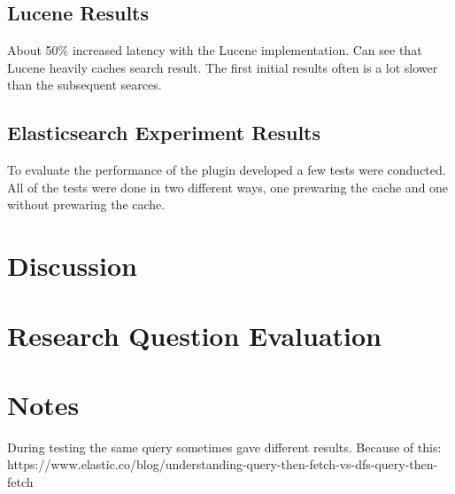 \subsection{Lucene Results}
About 50\% increased latency with the Lucene implementation.
Can see that Lucene heavily caches search result.
The first initial results often is a lot slower than the subsequent searces.

\subsection{Elasticsearch Experiment Results}
To evaluate the performance of the plugin developed a few tests were conducted.
All of the tests were done in two different ways,
one prewaring the cache and one without prewaring the cache.

\section{Discussion}

\section{Research Question Evaluation}

\section{Notes}
During testing the same query sometimes gave different results.
Because of this: https://www.elastic.co/blog/understanding-query-then-fetch-vs-dfs-query-then-fetch
